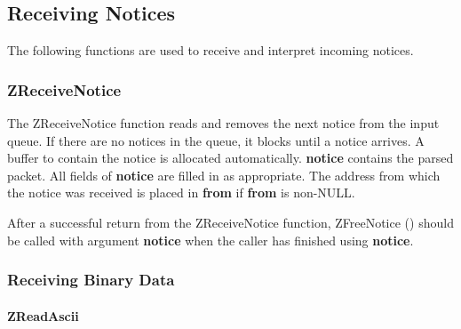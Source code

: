 %
\subsection{Receiving Notices}
\label{receiving-notices}

The following functions are used to receive and interpret incoming
notices.

\subsubsection{ZReceiveNotice}
\label{ZReceiveNotice}

\etemplate
{}

The ZReceiveNotice function reads and removes the next notice from the input
queue.  If there are no notices in the queue, it blocks until a notice
arrives. A buffer to contain the notice is allocated automatically.
{\bf notice} contains the parsed packet.  All
fields of {\bf notice} are filled in as appropriate.  The address from
which the notice was received is placed in {\bf *from} if {\bf from}
is non-NULL.

After a successful return from the ZReceiveNotice function,
ZFreeNotice () should be called with argument {\bf
notice} when the caller has finished using {\bf notice}.

\subsubsection{Receiving Binary Data}
\label{receiving-binary}

\paragraph{ZReadAscii}
\label{ZReadAscii}

\etemplate
{}

